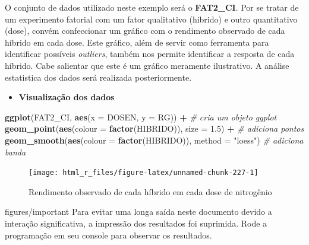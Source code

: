 \documentclass[
]{book}
\makeatletter
\newenvironment{Shaded}{\begin{snugshade}}{\end{snugshade}}
\newcommand{\CommentTok}[1]{\textcolor[rgb]{0.56,0.35,0.01}{\textit{#1}}}
\newcommand{\DataTypeTok}[1]{\textcolor[rgb]{0.13,0.29,0.53}{#1}}
\newcommand{\FloatTok}[1]{\textcolor[rgb]{0.00,0.00,0.81}{#1}}
\newcommand{\KeywordTok}[1]{\textcolor[rgb]{0.13,0.29,0.53}{\textbf{#1}}}
\newcommand{\NormalTok}[1]{#1}
\newcommand{\OperatorTok}[1]{\textcolor[rgb]{0.81,0.36,0.00}{\textbf{#1}}}
\newcommand{\StringTok}[1]{\textcolor[rgb]{0.31,0.60,0.02}{#1}}
\providecommand{\tightlist}{%
  \setlength{\itemsep}{0pt}\setlength{\parskip}{0pt}}
\numberwithin{equation}{section}
\newcommand{\indf}[1]{\index[function]{#1@\texttt{#1()}|ST}}
\newenvironment{importante}
  {\begin{customBlockImage}[colframe=customPurple, title=Importante]{figures/important}}
  {\end{customBlockImage}}
\makeatother
\begin{document}
O conjunto de dados utilizado neste exemplo será o \textbf{FAT2\_CI}. Por se tratar de um experimento fatorial com um fator qualitativo (hibrido) e outro quantitativo (dose), convém confeccionar um gráfico com o rendimento observado de cada híbrido em cada dose. Este gráfico, além de servir como ferramenta para identificar possíveis \emph{outliers}, também nos permite identificar a resposta de cada híbrido. Cabe salientar que este é um gráfico meramente ilustrativo. A análise estatistica dos dados será realizada posteriormente.

\begin{itemize}
\tightlist
\item
  \textbf{Visualização dos dados}
  \indf{ggplot}
\end{itemize}

\begin{Shaded}
\begin{Highlighting}[]
\KeywordTok{ggplot}\NormalTok{(FAT2\_CI, }\KeywordTok{aes}\NormalTok{(}\DataTypeTok{x =}\NormalTok{ DOSEN, }\DataTypeTok{y =}\NormalTok{ RG)) }\OperatorTok{+}\StringTok{ }\CommentTok{\# cria um objeto ggplot}
\StringTok{       }\KeywordTok{geom\_point}\NormalTok{(}\KeywordTok{aes}\NormalTok{(}\DataTypeTok{colour =} \KeywordTok{factor}\NormalTok{(HIBRIDO)), }\DataTypeTok{size =} \FloatTok{1.5}\NormalTok{) }\OperatorTok{+}\StringTok{ }\CommentTok{\# adiciona pontos}
\StringTok{       }\KeywordTok{geom\_smooth}\NormalTok{(}\KeywordTok{aes}\NormalTok{(}\DataTypeTok{colour =} \KeywordTok{factor}\NormalTok{(HIBRIDO)), }\DataTypeTok{method =} \StringTok{"loess"}\NormalTok{) }\CommentTok{\# adiciona banda}
\end{Highlighting}
\end{Shaded}

\begin{figure}

{\centering \texttt{[image: html\_r\_files/figure-latex/unnamed-chunk-227-1]} 

}

\caption{Rendimento observado de cada híbrido em cada dose de nitrogênio}\label{fig:unnamed-chunk-227}
\end{figure}

\begin{importante}
Para evitar uma longa saída neste documento devido a interação significativa, a impressão dos resultados foi suprimida. Rode a programação em seu console para observar os resultados.
\end{importante}
\end{document}
